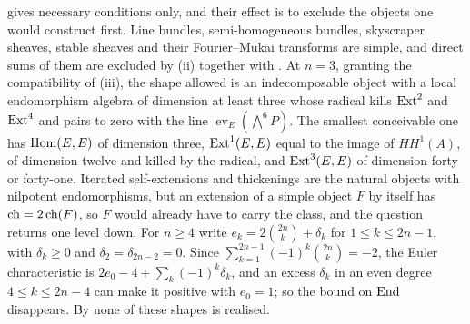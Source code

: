 \begin{remark}\label{rem:p2endo}
 gives necessary conditions only, and their effect is to
exclude the objects one would construct first. Line bundles, semi-homogeneous
bundles, skyscraper sheaves, stable sheaves and their Fourier--Mukai
transforms are simple, and direct sums of them are excluded by (ii) together
with \cite[Theorem~2.32]{paperIII}. At $n=3$, granting the compatibility of
(iii), the shape allowed is an indecomposable object
with a local endomorphism algebra of dimension at least three whose radical
kills $\operatorname{Ext}^{2}$ and $\operatorname{Ext}^{4}$ and pairs to zero with the line
$\operatorname{ev}_{E}(\bigwedge^{6}P)$. The smallest conceivable one has
$\operatorname{Hom}(E,E)$ of dimension three, $\operatorname{Ext}^{1}(E,E)$ equal to the image of
$HH^{1}(A)$, of dimension twelve and killed by the radical, and
$\operatorname{Ext}^{3}(E,E)$ of dimension forty or forty-one. Iterated self-extensions and
thickenings are the natural objects with nilpotent endomorphisms, but an
extension of a simple object $F$ by itself has $\operatorname{ch}=2\operatorname{ch}(F)$, so $F$ would
already have to carry the class, and the question returns one level down.
For $n\ge4$ write $e_{k}=2\binom{2n}{k}+\delta_{k}$ for $1\le k\le2n-1$,
with $\delta_{k}\ge0$ and $\delta_{2}=\delta_{2n-2}=0$. Since
$\sum_{k=1}^{2n-1}(-1)^{k}\binom{2n}{k}=-2$, the Euler characteristic is
$2e_{0}-4+\sum_{k}(-1)^{k}\delta_{k}$, and an excess $\delta_{k}$ in an even
degree $4\le k\le2n-4$ can make it positive with $e_{0}=1$; so the bound on
$\operatorname{End}$ disappears. By
 none of these shapes is realised.
\end{remark}
